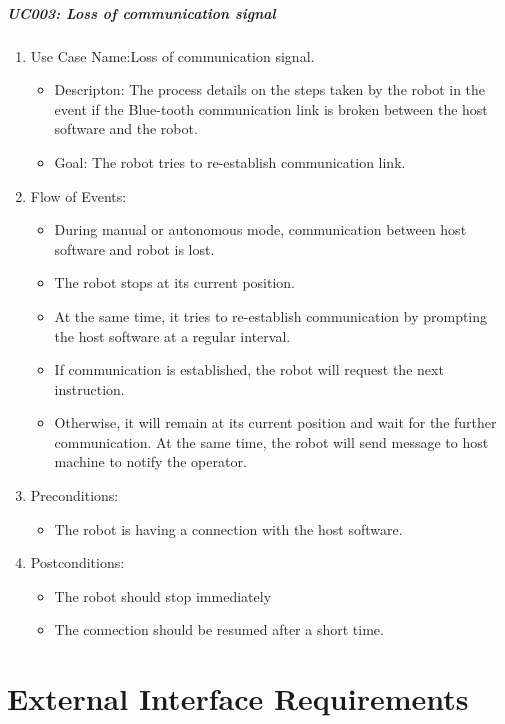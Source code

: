 \documentclass[11pt, a4paper]{report}
\begin{document}
\paragraph {UC003: Loss of communication signal}
\begin{enumerate}
	\item Use Case Name:Loss of communication signal.
	\begin{itemize}
		\item Descripton: The process details on the steps taken by the robot in the event if the Blue-tooth communication link is broken between the host software and the robot.
		\item Goal: The robot tries to re-establish communication link.
	\end{itemize}
	\item Flow of Events:
	\begin{itemize}
		\item During manual or autonomous mode, communication between host software and
robot is lost.
		\item The robot stops at its current position.
		\item At the same time, it tries to re-establish communication by prompting the host software
at a regular interval.
		\item If communication is established, the robot will request the next instruction.
		\item Otherwise, it will remain at its current position and wait for the further communication. At the same time, the robot will send message to host machine to notify the operator.
	\end{itemize}
	\item Preconditions:
	\begin{itemize}
		\item The robot is having a connection with the host software.
	\end{itemize}
\item Postconditions:
	\begin{itemize}
		\item The robot should stop immediately
		\item The connection should be resumed after a short time.
	\end{itemize}
\end{enumerate}
\pagebreak
 


\chapter{External Interface Requirements}
\end{document}
